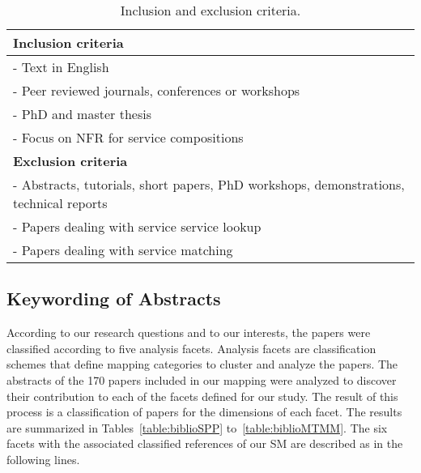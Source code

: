 \begin{table}\centering
\begin{tabular}{|l|} \hline
\textbf{Inclusion criteria}		\\ \hline\hline
- Text in English								\\ \hline
- Peer reviewed journals, conferences or workshops	\\ \hline
- PhD and master thesis	\\ \hline
- Focus on NFR for service compositions				\\ \hline\hline
\textbf{Exclusion criteria}		\\ \hline\hline	
- Abstracts, tutorials, short papers, PhD workshops, demonstrations, technical reports		\\ \hline	
- Papers dealing with service service lookup		\\ \hline
- Papers dealing with service matching 	\\ \hline
\end{tabular}
\caption{\label{table:criteria} Inclusion and exclusion criteria.}
\end{table}

\subsection{Keywording of Abstracts} 

According to our research questions and to our interests, the papers were classified according to five analysis facets. Analysis facets are classification schemes  that define mapping categories to cluster and analyze the papers. 
The abstracts of the 170 papers included in our mapping were analyzed to discover their contribution to each of the facets defined for our study.
The result of this process is a classification of papers for the dimensions of each facet.
The results are summarized in Tables~\ref{table:biblioSPP} to~\ref{table:biblioMTMM}.
The six facets with the associated classified references of our SM are described as in the following lines. 

